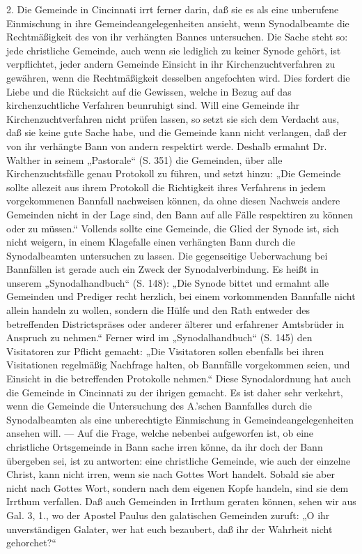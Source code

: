 2. Die Gemeinde in Cincinnati irrt ferner darin, daß sie es als eine unberufene Einmischung in ihre Gemeindeangelegenheiten ansieht, wenn Synodalbeamte die Rechtmäßigkeit des von ihr verhängten Bannes untersuchen. Die Sache steht so: jede christliche Gemeinde, auch wenn sie lediglich zu keiner Synode gehört, ist verpflichtet, jeder andern Gemeinde Einsicht in ihr Kirchenzuchtverfahren zu gewähren, wenn die Rechtmäßigkeit desselben angefochten wird. Dies fordert die Liebe und die Rücksicht auf die Gewissen, welche in Bezug auf das kirchenzuchtliche Verfahren beunruhigt sind. Will eine Gemeinde ihr Kirchenzuchtverfahren nicht prüfen lassen, so setzt sie sich dem Verdacht aus, daß sie keine gute Sache habe, und die Gemeinde kann nicht verlangen, daß der von ihr verhängte Bann von andern respektirt werde. Deshalb ermahnt Dr. Walther in seinem „Pastorale“ (S. 351) die Gemeinden, über alle Kirchenzuchtsfälle genau Protokoll zu führen, und setzt hinzu: „Die Gemeinde sollte allezeit aus ihrem Protokoll die Richtigkeit ihres Verfahrens in jedem vorgekommenen Bannfall nachweisen können, da ohne diesen Nachweis andere Gemeinden nicht in der Lage sind, den Bann auf alle Fälle respektiren zu können oder zu müssen.“ Vollends sollte eine Gemeinde, die Glied der Synode ist, sich nicht weigern, in einem Klagefalle einen verhängten Bann durch die Synodalbeamten untersuchen zu lassen. Die gegenseitige Ueberwachung bei Bannfällen ist gerade auch ein Zweck der Synodalverbindung. Es heißt in unserem „Synodalhandbuch“ (S. 148): „Die Synode bittet und ermahnt alle Gemeinden und Prediger recht herzlich, bei einem vorkommenden Bannfalle nicht allein handeln zu wollen, sondern die Hülfe und den Rath entweder des betreffenden Districtspräses oder anderer älterer und erfahrener Amtsbrüder in Anspruch zu nehmen.“ Ferner wird im „Synodalhandbuch“ (S. 145) den Visitatoren zur Pflicht gemacht: „Die Visitatoren sollen ebenfalls bei ihren Visitationen regelmäßig Nachfrage halten, ob Bannfälle vorgekommen seien, und Einsicht in die betreffenden Protokolle nehmen.“ Diese Synodalordnung hat auch die Gemeinde in Cincinnati zu der ihrigen gemacht. Es ist daher sehr verkehrt, wenn die Gemeinde die Untersuchung des A.’schen Bannfalles durch die Synodalbeamten als eine unberechtigte Einmischung in Gemeindeangelegenheiten ansehen will. — Auf die Frage, welche nebenbei aufgeworfen ist, ob eine christliche Ortsgemeinde in Bann sache irren könne, da ihr doch der Bann übergeben sei, ist zu antworten: eine christliche Gemeinde, wie auch der einzelne Christ, kann nicht irren, wenn sie nach Gottes Wort handelt. Sobald sie aber nicht nach Gottes Wort, sondern nach dem eigenen Kopfe handeln, sind sie dem Irrthum verfallen. Daß auch Gemeinden in Irrthum geraten können, sehen wir aus Gal. 3, 1., wo der Apostel Paulus den galatischen Gemeinden zuruft: „O ihr unverständigen Galater, wer hat euch bezaubert, daß ihr der Wahrheit nicht gehorchet?“

